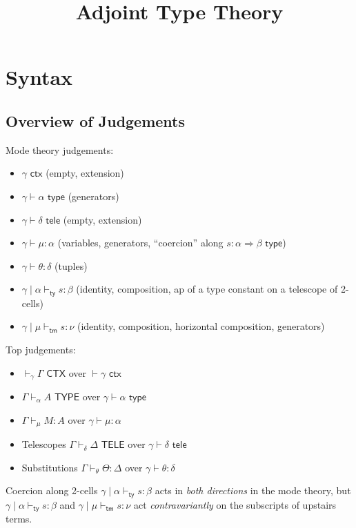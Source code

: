 \documentclass[10pt]{article}
\title{Adjoint Type Theory}
\author{}
\date{}
\newcommand{\yields}{\vdash}
\newcommand{\CTX}{\,\,\mathsf{CTX}}
\newcommand{\ctx}{\,\,\mathsf{ctx}}
\newcommand{\TYPE}{\,\,\mathsf{TYPE}}
\newcommand{\type}{\,\,\mathsf{type}}
\newcommand{\TELE}{\,\,\mathsf{TELE}}
\newcommand{\tele}{\,\,\mathsf{tele}}
\newcommand\TypeTwo[4]{\ensuremath{#1 \mid #3 \yields_\mathsf{ty} #2 : #4}}
\newcommand\TermTwo[4]{\ensuremath{#1 \mid #3 \yields_\mathsf{tm} #2 : #4}}
\begin{document}
\maketitle

\section{Syntax}

\subsection{Overview of Judgements}

Mode theory judgements:
\begin{itemize}
\item $\gamma \ctx$ (empty, extension)
\item $\gamma \yields \alpha \type$ (generators)
\item $\gamma \yields \delta \tele$ (empty, extension)
\item $\gamma \yields \mu : \alpha$ (variables, generators, ``coercion''
  along $s : \alpha \Rightarrow \beta \type$)
\item $\gamma \yields \theta : \delta$ (tuples)
\item $\TypeTwo{\gamma}{s}{\alpha}{\beta}$ (identity,
  composition, ap of a type constant on a telescope of 2-cells)
\item $\TermTwo{\gamma}{s}{\mu}{\nu}$ (identity,
  composition, horizontal composition, generators)
\end{itemize}
Top judgements: 
\begin{itemize}
\item $\yields_\gamma \Gamma \CTX$ over $\yields \gamma \ctx$
\item $\Gamma \yields_\alpha A \TYPE$ over $\gamma \yields \alpha \type$
\item $\Gamma \yields_\mu M : A$ over $\gamma \yields \mu : \alpha$
\item Telescopes $\Gamma \yields_\delta \Delta \TELE$ over $\gamma \yields \delta \tele$
\item Substitutions $\Gamma \yields_\theta \Theta : \Delta$ over $\gamma \yields \theta : \delta$
\end{itemize}

Coercion along 2-cells $\TypeTwo{\gamma}{s}{\alpha}{\beta}$ acts in \emph{both directions} in the mode theory, but $\TypeTwo{\gamma}{s}{\alpha}{\beta}$ and $\TermTwo{\gamma}{s}{\mu}{\nu}$ act \emph{contravariantly} on the subscripts of upstairs terms.
\end{document}
